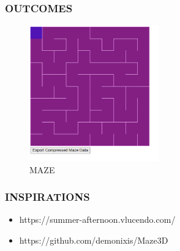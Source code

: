 \documentclass[9pt]{beamer}
\begin{document}
\begin{frame}
    \frametitle{OUTCOMES}
    \begin{figure}[h]
        \centering
        \includegraphics[width=0.5\textwidth, height=0.5\textheight]{MazeData.png}
        \caption{MAZE}
    \end{figure}
\end{frame}


\begin{frame}
    \frametitle{INSPIRATIONS}
    \begin{itemize}
        \item https://summer-afternoon.vlucendo.com/
        \item https://github.com/demonixis/Maze3D
    \end{itemize}
\end{frame}
\end{document}
